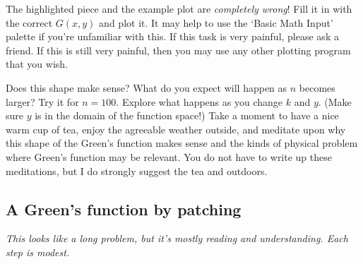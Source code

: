 \documentclass[12pt]{article}
\numberwithin{equation}{subsection}    %
\begin{document}
The highlighted piece and the example plot are \emph{completely wrong}! Fill it in with the correct $G(x,y)$ and plot it. It may help to use the `Basic Math Input' palette if you're unfamiliar with this. If this task is very painful, please ask a friend. If this is still very painful, then you may use any other plotting program that you wish. 

Does this shape make sense? What do you expect will happen as $n$ becomes larger? Try it for $n=100$. Explore what happens as you change $k$ and $y$. (Make sure $y$ is in the domain of the function space!) Take a moment to have a nice warm cup of tea, enjoy the agreeable weather outside, and meditate upon why this shape of the Green's function makes sense and the kinds of physical problem where Green's function may be relevant. You do not have to write up these meditations, but I do strongly suggest the tea and outdoors.  




\subsection{A Green's function by patching}

\emph{This looks like a long problem, but it's mostly reading and understanding. Each step is modest.}

\end{document}
